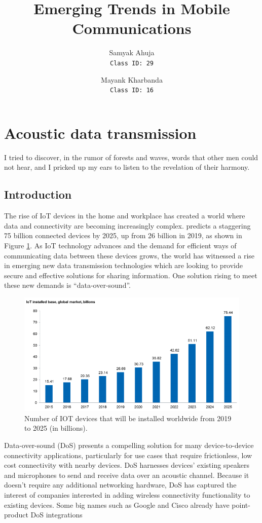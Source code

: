 \documentclass{article}
\title{Emerging Trends in Mobile Communications}
\author{
    Samyak Ahuja \\
    \texttt{Class ID: 29}
    \and
    Mayank Kharbanda \\
    \texttt{Class ID: 16}
}
\begin{document}
\maketitle

\section{Acoustic data transmission}
\epigraph{ I tried to discover, in the rumor of forests and waves, words
that other men could not hear, and I pricked up my ears to listen to the
revelation of their harmony.}{\textcite{november05}}

\subsection{Introduction}
The rise of IoT devices in the home and workplace has created a world where
data and connectivity are becoming increasingly complex. \textcite{ihs16}
predicts a staggering 75 billion connected devices by 2025, up from 26 billion
in 2019, as shown in Figure \ref{fig:ihs_iot}.  As IoT technology advances and the
demand for efficient ways of communicating data between these devices grows,
the world has witnessed a rise in emerging new data transmission technologies
which are looking to provide secure and effective solutions for sharing
information. One solution rising to meet these new demands is “data-over-sound”.

\begin{figure}[!h]
  \includegraphics[width=\linewidth]{res/iot_market_trend.png}
    \caption{Number of IOT devices that will be installed worldwide from 2019
    to 2025 (in billions).}
  \label{fig:ihs_iot}
\end{figure}


Data-over-sound (DoS) presents a compelling solution for many device-to-device
connectivity applications, particularly for use cases that require
frictionless, low cost connectivity with nearby devices. DoS harnesses devices’
existing speakers and microphones to send and receive data over an acoustic
channel. Because it doesn’t require any additional networking hardware, DoS has
captured the interest of companies interested in adding wireless connectivity
functionality to existing devices. Some big names such as Google and Cisco
already have point-product DoS integrations
\end{document}
